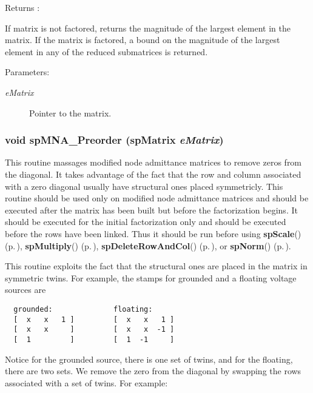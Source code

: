 \begin{Desc}
\item[Returns :]\par
 If matrix is not factored, returns the magnitude of the largest element in the matrix. If the matrix is factored, a bound on the magnitude of the largest element in any of the reduced submatrices is returned.\end{Desc}
\begin{Desc}
\item[Parameters: ]\par
\begin{description}
\item[{\em 
e\-Matrix}]Pointer to the matrix. \end{description}
\end{Desc}
\subsubsection{\setlength{\rightskip}{0pt plus 5cm}void sp\-MNA\_\-Preorder ({\bf sp\-Matrix} {\em e\-Matrix})}\label{spUtils_8c_a11}


This routine massages modified node admittance matrices to remove zeros from the diagonal. It takes advantage of the fact that the row and column associated with a zero diagonal usually have structural ones placed symmetricly. This routine should be used only on modified node admittance matrices and should be executed after the matrix has been built but before the factorization begins. It should be executed for the initial factorization only and should be executed before the rows have been linked. Thus it should be run before using {\bf sp\-Scale}() {\rm (p.\,\pageref{spUtils_8c_a12})}, {\bf sp\-Multiply}() {\rm (p.\,\pageref{spUtils_8c_a14})}, {\bf sp\-Delete\-Row\-And\-Col}() {\rm (p.\,\pageref{spUtils_8c_a18})}, or {\bf sp\-Norm}() {\rm (p.\,\pageref{spUtils_8c_a21})}.

This routine exploits the fact that the structural ones are placed in the matrix in symmetric twins. For example, the stamps for grounded and a floating voltage sources are 

\footnotesize\begin{verbatim}  grounded:              floating:
  [  x   x   1 ]         [  x   x   1 ]
  [  x   x     ]         [  x   x  -1 ]
  [  1         ]         [  1  -1     ]
\end{verbatim}\normalsize 
 Notice for the grounded source, there is one set of twins, and for the floating, there are two sets. We remove the zero from the diagonal by swapping the rows associated with a set of twins. For example: 


